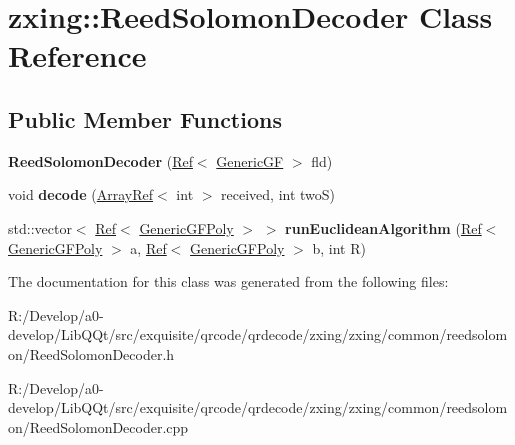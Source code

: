 \hypertarget{classzxing_1_1_reed_solomon_decoder}{}\section{zxing\+:\+:Reed\+Solomon\+Decoder Class Reference}
\label{classzxing_1_1_reed_solomon_decoder}
\subsection*{Public Member Functions}
\begin{DoxyCompactItemize}
\item 
\mbox{\label{classzxing_1_1_reed_solomon_decoder_ac354d47971675e7a6947bcbcfa90208c}} 
{\bfseries Reed\+Solomon\+Decoder} (\mbox{\hyperlink{classzxing_1_1_ref}{Ref}}$<$ \mbox{\hyperlink{classzxing_1_1_generic_g_f}{Generic\+GF}} $>$ fld)
\item 
\mbox{\label{classzxing_1_1_reed_solomon_decoder_a2f24257e11a2e7b822d04e8f4832f490}} 
void {\bfseries decode} (\mbox{\hyperlink{classzxing_1_1_array_ref}{Array\+Ref}}$<$ int $>$ received, int twoS)
\item 
\mbox{\label{classzxing_1_1_reed_solomon_decoder_a8a3a6e12f0e348b6c40e36369255bfda}} 
std\+::vector$<$ \mbox{\hyperlink{classzxing_1_1_ref}{Ref}}$<$ \mbox{\hyperlink{classzxing_1_1_generic_g_f_poly}{Generic\+G\+F\+Poly}} $>$ $>$ {\bfseries run\+Euclidean\+Algorithm} (\mbox{\hyperlink{classzxing_1_1_ref}{Ref}}$<$ \mbox{\hyperlink{classzxing_1_1_generic_g_f_poly}{Generic\+G\+F\+Poly}} $>$ a, \mbox{\hyperlink{classzxing_1_1_ref}{Ref}}$<$ \mbox{\hyperlink{classzxing_1_1_generic_g_f_poly}{Generic\+G\+F\+Poly}} $>$ b, int R)
\end{DoxyCompactItemize}


The documentation for this class was generated from the following files\+:\begin{DoxyCompactItemize}
\item 
R\+:/\+Develop/a0-\/develop/\+Lib\+Q\+Qt/src/exquisite/qrcode/qrdecode/zxing/zxing/common/reedsolomon/Reed\+Solomon\+Decoder.\+h\item 
R\+:/\+Develop/a0-\/develop/\+Lib\+Q\+Qt/src/exquisite/qrcode/qrdecode/zxing/zxing/common/reedsolomon/Reed\+Solomon\+Decoder.\+cpp\end{DoxyCompactItemize}
